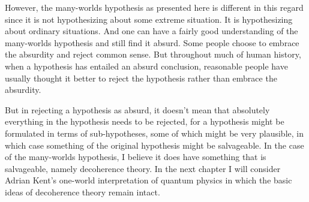 \documentclass[letter, 12pt]{turabian-thesis}
\theoremstyle{hypothesis}
\begin{document}
 However, the many-worlds hypothesis as presented here is different in this regard since it is not hypothesizing about some extreme situation. It is hypothesizing about ordinary situations. And one can have a fairly good understanding of the many-worlds hypothesis and still find it absurd. Some people choose to embrace the absurdity and reject common sense. But throughout much of human history, when a hypothesis has entailed an absurd conclusion, reasonable people have usually thought it better to reject the hypothesis rather than embrace the absurdity. 
  
 But in rejecting a hypothesis as absurd, it doesn't mean that absolutely everything in the hypothesis needs to be rejected, for  a hypothesis might be formulated in terms of sub-hypotheses, some of which might be very plausible, in which case something of the original hypothesis might be salvageable. In the case of the many-worlds hypothesis, I believe it does have something that is salvageable, namely decoherence theory. In the next chapter I will consider Adrian Kent's one-world interpretation of quantum physics in which the basic ideas of decoherence theory remain intact.






\printbibliography
\end{document}
